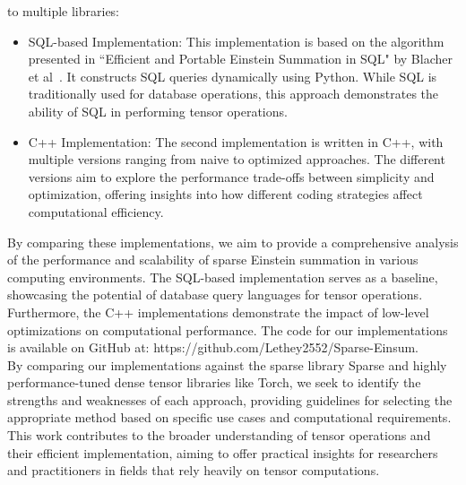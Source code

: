 to multiple libraries:
%
\begin{itemize}
      \item SQL-based Implementation:
            This implementation is based on the algorithm presented in ``Efficient and
            Portable Einstein Summation in SQL" by Blacher et al~\cite{sql_einsum}.
            It constructs SQL queries dynamically using Python. While SQL is
            traditionally used for database operations, this approach demonstrates
            the ability of SQL in performing tensor operations.
      \item C++ Implementation: The second implementation is written in C++, with multiple
            versions ranging from naive to optimized approaches. The different versions
            aim to explore the performance trade-offs between simplicity and optimization,
            offering insights into how different coding strategies affect computational
            efficiency.
\end{itemize}
%
%
By comparing these implementations, we aim to provide a comprehensive analysis of
the performance and scalability of sparse Einstein summation in various
computing environments. The SQL-based implementation serves as a baseline,
showcasing the potential of database query languages for tensor operations.
Furthermore, the C++ implementations demonstrate the impact of low-level optimizations
on computational performance. The code for our implementations is available on
GitHub at: https://github.com/Lethey2552/Sparse-Einsum.
\\
By comparing our implementations against the sparse library Sparse and highly
performance-tuned dense tensor libraries like Torch, we seek to identify the
strengths and weaknesses of each approach, providing guidelines for selecting the
appropriate method based on specific use cases and computational requirements.
This work contributes to the broader understanding of tensor operations and their
efficient implementation, aiming to offer practical insights for researchers and
practitioners in fields that rely heavily on tensor computations.